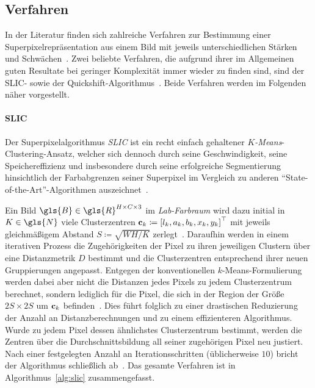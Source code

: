 \subsection{Verfahren}
\label{superpixel_verfahren}

In der Literatur finden sich zahlreiche Verfahren zur Bestimmung einer Superpixelrepräsentation aus einem Bild mit jeweils unterschiedlichen Stärken und Schwächen~\cite{super, slic}.
Zwei beliebte Verfahren, die aufgrund ihrer im Allgemeinen guten Resultate bei geringer Komplexität immer wieder zu finden sind, sind der SLIC- sowie der Quickshift-Algorithmus~\cite{slic, super, Gadde, supercnn, Fulkerson}.
Beide Verfahren werden im Folgenden näher vorgestellt.

\paragraph{SLIC}
\label{slic}

Der Superpixelalgorithmus \emph{\gls{SLIC}} ist ein recht einfach gehaltener \emph{$K$-Means}-Clustering-Ansatz, welcher sich dennoch durch seine Geschwindigkeit, seine Speichereffizienz und insbesondere durch seine erfolgreiche Segmentierung hinsichtlich der Farbabgrenzen seiner Superpixel im Vergleich zu anderen \enquote{State-of-the-Art}-Algorithmen auszeichnet~\cite{slic, Gadde}.

Ein Bild $\gls{B} \in \gls{R}^{H \times C \times 3}$ im \emph{Lab-Farbraum} wird dazu initial in $K \in \gls{N}$ viele Clusterzentren $\ve{c}_k \coloneqq {\left[l_k, a_k, b_k, x_k, y_k\right]}^{\top}$  mit jeweils gleichmäßigem Abstand $S \coloneqq \sqrt{WH/K}$ zerlegt~\cite{slic}.
Daraufhin werden in einem iterativen Prozess die Zugehörigkeiten der Pixel zu ihren jeweiligen Clustern über eine Distanzmetrik $D$ bestimmt und die Clusterzentren entsprechend ihrer neuen Gruppierungen angepasst.
Entgegen der konventionellen $k$-Means-Formulierung werden dabei aber nicht die Distanzen jedes Pixels zu jedem Clusterzentrum berechnet, sondern lediglich für die Pixel, die sich in der Region der Größe $2S \times 2S$ um $\mathbf{c}_k$ befinden~\cite{slic}.
Dies führt folglich zu einer drastischen Reduzierung der Anzahl an Distanzberechnungen und zu einem effizienteren Algorithmus.
Wurde zu jedem Pixel dessen ähnlichstes Clusterzentrum bestimmt, werden die Zentren über die Durchschnittsbildung all seiner zugehörigen Pixel neu justiert.
Nach einer festgelegten Anzahl an Iterationsschritten (üblicherweise $10$) bricht der Algorithmus schließlich ab~\cite{slic}.
Das gesamte Verfahren ist in Algorithmus~\ref{alg:slic} zusammengefasst.


